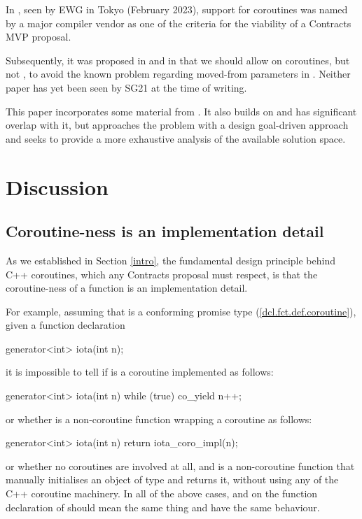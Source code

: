 In \cite{P3173R0}, seen by EWG in Tokyo (February 2023), support for coroutines was named by a major compiler vendor as one of the criteria for the viability of a Contracts MVP proposal.

Subsequently, it was proposed in \cite{P2957R1} and in \cite{P3251R0} that we should allow  on coroutines, but not , to avoid the known problem regarding moved-from parameters in . Neither paper has yet been seen by SG21 at the time of writing.

This paper incorporates some material from \cite{P3251R0}. It also builds on \cite{P2957R1} and has significant overlap with it, but approaches the problem with a design goal-driven approach and seeks to provide a more exhaustive analysis of the available solution space. 

\section{Discussion}

\subsection{Coroutine-ness is an implementation detail}
\label{impldetail}

As we established in Section \ref{intro}, the fundamental design principle behind C++ coroutines, which any Contracts proposal must respect, is that the coroutine-ness of a function  is an implementation detail.

For example, assuming that  is a conforming promise type (\href{https://eel.is/c++draft/dcl.fct.def.coroutine}{[dcl.fct.def.coroutine]}), given a function declaration 
\begin{codeblock}
generator<int> iota(int n); 
\end{codeblock}
it is impossible to tell if  is a coroutine implemented as follows:
\begin{codeblock}
generator<int> iota(int n) {
  while (true)
    co_yield n++;
}
\end{codeblock}
or whether  is a non-coroutine function wrapping a coroutine  as follows:
\begin{codeblock}
generator<int> iota(int n) {
  return iota_coro_impl(n);
}
\end{codeblock}
or whether no coroutines are involved at all, and  is a non-coroutine function that manually initialises an object of type  and returns it, without using any of the C++ coroutine machinery. In all of the above cases,  and  on the function declaration of  should mean the same thing and have the same behaviour.

